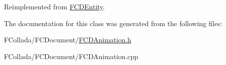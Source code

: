 Reimplemented from \hyperlink{classFCDEntity_abfd4312a7124f92364c1e6517c7e60ba}{FCDEntity}.



The documentation for this class was generated from the following files:\begin{DoxyCompactItemize}
\item 
FCollada/FCDocument/\hyperlink{FCDAnimation_8h}{FCDAnimation.h}\item 
FCollada/FCDocument/FCDAnimation.cpp\end{DoxyCompactItemize}
